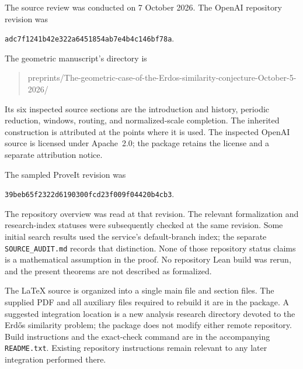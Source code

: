 The source review was conducted on 7 October 2026. The OpenAI
repository revision was
\begin{center}\small\texttt{adc7f1241b42e322a6451854ab7e4b4c146bf78a}.\end{center}
The geometric manuscript's directory is
\begin{quote}\small\ttfamily\raggedright
preprints/The-geometric-case-of-the-Erdos-similarity-conjecture-October-5-2026/
\end{quote}
Its six inspected source sections are the introduction and history,
periodic reduction, windows, routing, and normalized-scale completion.
The inherited construction is attributed at the points where it is
used. The inspected OpenAI source is licensed under Apache~2.0; the package retains
the license and a separate attribution notice.

The sampled ProveIt revision was
\begin{center}\small\texttt{39beb65f2322d6190300fcd23f009f04420b4cb3}.\end{center}
The repository overview was read at that revision. The relevant
formalization and research-index statuses were subsequently checked
at the same revision. Some initial search results used the service's
default-branch index; the separate \texttt{SOURCE\_AUDIT.md} records
that distinction. None of those repository status claims is a
mathematical assumption in the proof. No repository Lean build was
rerun, and the present theorems are not described as formalized.

The LaTeX source is organized into a single main file and section
files. The supplied PDF and all auxiliary files required to rebuild
it are in the package. A suggested integration location is a new
analysis research directory devoted to the Erd\H{o}s similarity
problem; the package does not modify either remote repository.
Build instructions and the exact-check command are in the accompanying
\texttt{README.txt}. Existing repository instructions remain relevant
to any later integration performed there.
